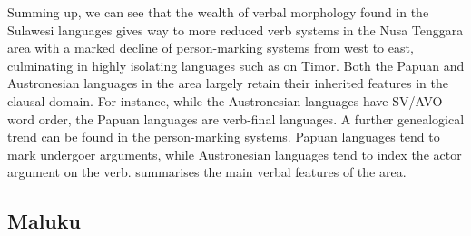Summing up, we can see that the wealth of verbal morphology found in the Sulawesi languages gives way to more reduced verb systems in the Nusa Tenggara area with a marked decline of person-marking systems from west to east, culminating in highly isolating languages such as  on Timor. Both the Papuan and Austronesian languages in the area largely retain their inherited features in the clausal domain. For instance, while the Austronesian languages have SV/AVO word order, the Papuan languages are verb-final languages. A further genealogical trend can be found in the person-marking systems. Papuan languages tend to mark undergoer arguments, while Austronesian languages tend to index the actor argument on the verb.  summarises the main verbal features of the area.

\begin{table}[h]
\caption[Basic verbal features of Nusa Tenggara languages]{Overview of basic verbal features of the Nusa Tenggara languages in the EI data set. Constituent order lists only the basic pattern, pragmatically induced alternative patterns are often also possible. Brackets around person marking formulae indicate that the system does not apply to all verbs in all contexts. Grouping of languages is roughly according to the discussion in the prose.}
\label{table:overviewnusa}
\end{table}

\subsection{Maluku} \label{sec:maluku}

